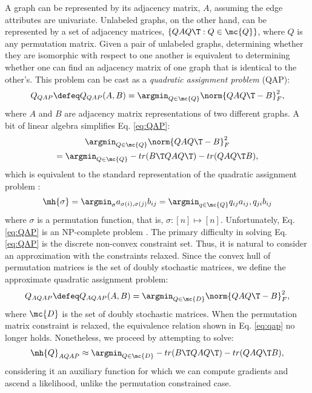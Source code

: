 \documentclass[10pt,journal,cspaper,compsoc]{IEEEtran}
\begin{document}
A graph can be represented by its adjacency matrix, $A$, assuming the edge attributes are univariate.  Unlabeled graphs, on the other hand, can be represented by a set of adjacency matrices, $\{QAQ\T : Q \in \mc{Q}\}$, where $Q$ is any permutation matrix.  Given a pair of unlabeled graphs, determining whether they are isomorphic with respect to one another is equivalent to determining whether one can find an adjacency matrix of one graph that is identical to the other's.  This problem can be cast as a \emph{quadratic assignment problem} (QAP):
 \begin{align} \label{eq:QAP}
	Q_{QAP} \defeq Q_{QAP}(A,B)= \argmin_{Q \in \mc{Q}} \norm{Q A Q\T - B}^2_F,
\end{align}
where $A$ and $B$ are adjacency matrix representations of two different graphs. A bit of linear algebra simplifies Eq. \eqref{eq:QAP}: %
\begin{multline} \label{eq:qap}
	\argmin_{Q \in \mc{Q}} \norm{Q A Q\T - B}^2_F \\
	= \argmin_{Q \in \mc{Q}} - tr(B\T QAQ\T) - tr(QAQ\T B),			
\end{multline}
which is equivalent to the standard representation of the quadratic assignment problem \cite{Conte2004}:
\begin{align}
	\mh{\sigma}= \argmin_{\sigma} a_{\sigma(i), \sigma(j)} b_{ij} = \argmin_{q \in \mc{Q}} q_{ij} a_{ij}, q_{ji} b_{ij}
\end{align}
where $\sigma$ is a permutation function, that is, $\sigma: [n] \mapsto [n]$.  Unfortunately, Eq. \eqref{eq:QAP} is an NP-complete problem \cite{Garey1979a}. The primary difficulty in solving Eq. \eqref{eq:QAP} is the discrete non-convex constraint set.  Thus, it is natural to consider an approximation with the constraints relaxed.  Since the convex hull of permutation matrices is the set of doubly stochastic matrices, we define the approximate quadratic assignment problem:
\begin{align} \label{eq:tqap}
	Q_{AQAP} \defeq Q_{AQAP}(A,B) = \argmin_{Q \in \mc{D}} \norm{Q A Q\T - B}^2_F,
\end{align}
where $\mc{D}$ is the set of doubly stochastic matrices.  When the permutation matrix constraint is relaxed, the equivalence relation shown in Eq. \eqref{eq:qap} no longer holds.  Nonetheless, we proceed by attempting to solve:
\begin{align} \label{eq:nqap}
	\mh{Q}_{AQAP} \approx \argmin_{Q \in \mc{D}} - tr(B\T QAQ\T) - tr(QAQ\T B),
\end{align}
considering it an auxiliary function for which we can compute gradients and ascend a likelihood, unlike the permutation constrained case.  
\end{document}
